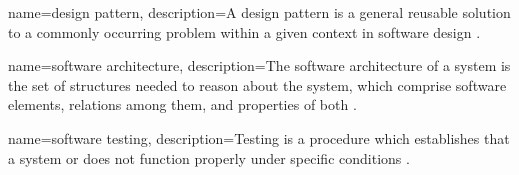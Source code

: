 

 {
  name=design pattern,
  description={A design pattern is a general reusable solution to a commonly occurring problem within a given context in software design \cite{Gamma1995}.}
}

 {
  name=software architecture,
  description={The software architecture of a system is the set of structures needed to reason about the system, which comprise software elements, relations among them, and properties of both \cite{Clements2003}.}
}

 {
  name=software testing,
  description={Testing is a procedure which establishes that a system or does not function properly under specific conditions \cite{ElectronicsEngingeers1990}.}
}

